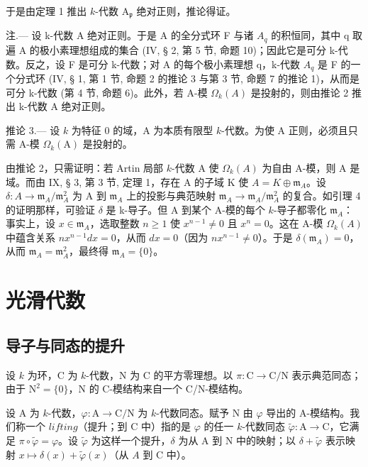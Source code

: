 于是由定理 1 推出 \(k\)-代数 \(\mathrm{A}_{\mathfrak{p}}\) 绝对正则，推论得证。

注.--- 设 k-代数 A 绝对正则。于是 A 的全分式环 F 与诸 \(A_{q}\) 的积恒同，其中 q 取遍 A 的极小素理想组成的集合 (IV, § 2, 第 5 节, 命题 10)；因此它是可分 k-代数。反之，设 F 是可分 k-代数；对 A 的每个极小素理想 q，k-代数 \(A_{q}\) 是 F 的一个分式环 (IV, § 1, 第 1 节, 命题 2 的推论 3 与第 3 节, 命题 7 的推论 1)，从而是可分 k-代数 (第 4 节, 命题 6)。此外，若 A-模 \(\Omega_{k}(A)\) 是投射的，则由推论 2 推出 k-代数 A 绝对正则。

推论 3.--- 设 \(k\) 为特征 0 的域，A 为本质有限型 \(k\)-代数。为使 A 正则，必须且只需 A-模 \(\Omega_{k}(\mathrm{A})\) 是投射的。

由推论 2，只需证明：若 Artin 局部 \(k\)-代数 A 使 \(\Omega_k(A)\) 为自由 A-模，则 A 是域。而由 IX, § 3, 第 3 节, 定理 1，存在 A 的子域 K 使 \(A = K \oplus \mathfrak{m}_A\)。设 \(\delta: A \to \mathfrak{m}_A / \mathfrak{m}_A^2\) 为 A 到 \(\mathfrak{m}_A\) 上的投影与典范映射 \(\mathfrak{m}_A \to \mathfrak{m}_A / \mathfrak{m}_A^2\) 的复合。如引理 4 的证明那样，可验证 \(\delta\) 是 k-导子。但 A 到某个 A-模的每个 \(k\)-导子都零化 \(\mathfrak{m}_A\)：事实上，设 \(x \in \mathfrak{m}_A\)，选取整数 \(n \geqslant 1\) 使 \(x^{n-1} \neq 0\) 且 \(x^n = 0\)。这在 A-模 \(\Omega_k(A)\) 中蕴含关系 \(nx^{n-1} dx = 0\)，从而 \(dx = 0\)（因为 \(nx^{n-1} \neq 0\)）。于是 \(\delta(\mathfrak{m}_A) = 0\)，从而 \(\mathfrak{m}_A = \mathfrak{m}_A^2\)，最终得 \(\mathfrak{m}_A = \{0\}\)。

\section{光滑代数}

\subsection{导子与同态的提升}

设 \(k\) 为环，C 为 \(k\)-代数，N 为 C 的平方零理想。以 \(\pi : \mathrm{C} \to \mathrm{C/N}\) 表示典范同态；由于 \(\mathrm{N}^2 = \{0\}\)，N 的 C-模结构来自一个 C/N-模结构。

设 A 为 \(k\)-代数，\(\varphi : \mathrm{A} \to \mathrm{C/N}\) 为 \(k\)-代数同态。赋予 N 由 \(\varphi\) 导出的 A-模结构。我们称一个 \(lifting\)（提升；到 C 中）指的是 \(\varphi\) 的任一 \(k\)-代数同态 \(\tilde{\varphi} : \mathrm{A} \to \mathrm{C}\)，它满足 \(\pi \circ \tilde{\varphi} = \varphi\)。设 \(\tilde{\varphi}\) 为这样一个提升，\(\delta\) 为从 A 到 N 中的映射；以 \(\delta + \tilde{\varphi}\) 表示映射 \(x \mapsto \delta(x) + \tilde{\varphi}(x)\)（从 \(A\) 到 C 中）。

